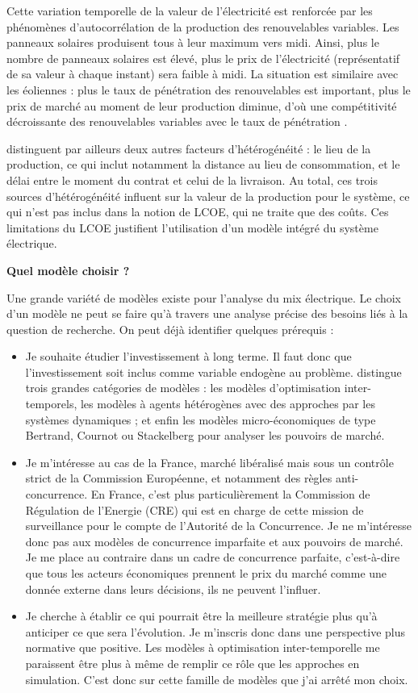 Cette variation temporelle de la valeur de l'électricité est renforcée par les phénomènes d’autocorrélation de la production des renouvelables variables. Les panneaux solaires produisent tous à leur maximum vers midi. Ainsi, plus le nombre de panneaux solaires est élevé, plus le prix de l’électricité (représentatif de sa valeur à chaque instant) sera faible à midi. La situation est similaire avec les éoliennes : plus le taux de pénétration des renouvelables est important, plus le prix de marché au moment de leur production diminue, d’où une compétitivité décroissante des renouvelables variables avec le taux de pénétration \citep{Hirth2013}.

\citet{Hirth2016} distinguent par ailleurs deux autres facteurs d’hétérogénéité : le lieu de la production, ce qui inclut notamment la distance au lieu de consommation, et le délai entre le moment du contrat et celui de la livraison. Au total, ces trois sources d’hétérogénéité influent sur la valeur de la production pour le système, ce qui n’est pas inclus dans la notion de LCOE, qui ne traite que des coûts. 
Ces limitations du LCOE justifient l’utilisation d’un modèle intégré du système électrique.

\vspace{1em}
\textbf{Quel modèle choisir ?}

Une grande variété de modèles existe pour l’analyse du mix électrique. Le choix d’un modèle ne peut se faire qu’à travers une analyse précise des besoins liés à la question de recherche.
On peut déjà identifier quelques prérequis :
\begin{itemize}
	\item Je souhaite étudier l’investissement à long terme. Il faut donc que l’investissement soit inclus comme variable endogène au problème. \citet{Petitet2016} distingue trois grandes catégories de modèles : les modèles d’optimisation inter-temporels, les modèles à agents hétérogènes avec des approches par les systèmes dynamiques ; et enfin les modèles micro-économiques de type Bertrand, Cournot ou Stackelberg pour analyser les pouvoirs de marché. 
	\item Je m’intéresse au cas de la France, marché libéralisé mais sous un contrôle strict de la Commission Européenne, et notamment des règles anti-concurrence. En France, c’est plus particulièrement la Commission de Régulation de l’Energie (CRE) qui est en charge de cette mission de surveillance pour le compte de l'Autorité de la Concurrence. Je ne m’intéresse donc pas aux modèles de concurrence imparfaite et aux pouvoirs de marché. Je me place au contraire dans un cadre de concurrence parfaite, c’est-à-dire que tous les acteurs économiques prennent le prix du marché comme une donnée externe dans leurs décisions, ils ne peuvent l’influer. 
	\item Je cherche à établir ce qui pourrait être la meilleure stratégie plus qu’à anticiper ce que sera l’évolution. Je m’inscris donc dans une perspective plus normative que positive. Les modèles à optimisation inter-temporelle me paraissent être plus à même de remplir ce rôle que les approches en simulation. C’est donc sur cette famille de modèles que j’ai arrêté mon choix.
\end{itemize}

